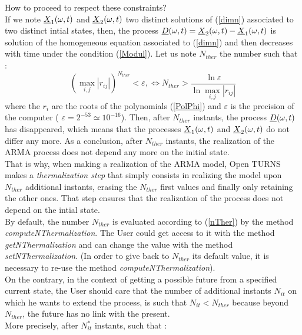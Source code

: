 How to proceed to respect these constraints?\\
If we note ${\underline{X}}_1(\omega,t)$ and  ${\underline{X}}_2(\omega,t)$ two distinct solutions of (\ref{dimn}) associated to two distinct intial states, then, the process ${\underline{D}}(\omega,t) = {\underline{X}}_2(\omega,t) - {\underline{X}}_1(\omega,t)$ is solution of the homogeneous equation associated to  (\ref{dimn}) and then decreases with time under the condition (\ref{Modul}). Let us note  $N_{ther}$ the number such that : 
\begin{equation}\label{nTher}
  \left( \max_{i,j} |r_{ij}| \right)^{N_{ther}} < \varepsilon ,\Longleftrightarrow N_{ther} > \displaystyle \frac{\ln  \varepsilon}{\ln \max_{i,j} |r_{ij}|}
\end{equation}
where  the $r_i$ are the roots of the polynomials (\ref{PolPhi}) and  $\varepsilon$ is the precision of the computer ( $\varepsilon =2^{-53} \simeq 10^{-16}$). Then, after $N_{ther}$ instants, the process  ${\underline{D}}(\omega,t)$ has disappeared, which means that the processes  ${\underline{X}}_1(\omega,t)$ and  ${\underline{X}}_2(\omega,t)$ do not differ any more. As a conclusion, after  $N_{ther}$ instants, the realization of the ARMA process does not depend any more on the initial state.\\
That is why, when making a realization of the ARMA model, Open TURNS makes a \emph{thermalization step} that simply consists in realizing the model upon $N_{ther}$ additional instants, erasing the $N_{ther}$ first values and finally only retaining the other ones. That step ensures that the realization of the process does not depend on the intial state.  \\
By default, the number  $N_{ther}$ is evaluated according to (\ref{nTher}) by the method  \emph{computeNThermalization}. The User could get access to it with the method \emph{getNThermalization} and can change the value with the method \emph{setNThermalization}. (In order to give back to $N_{ther}$ its default value, it is necessary to re-use the method  \emph{computeNThermalization}).\\

On the contrary, in the context of getting a possible future from a specified current state, the User should care that the number of additional instants $N_{it}$ on which he wants to extend the process, is such that $N_{it} <  N_{ther}$ because beyond $N_{ther}$, the future has no link with the present.\\
More precisely, after $N_{it}^*$ instants, such that : 

